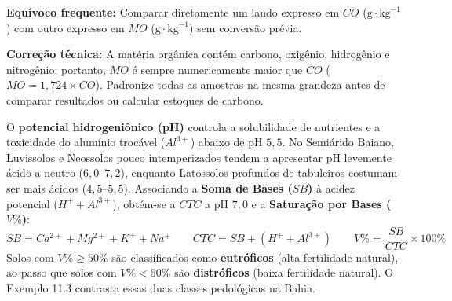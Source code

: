 \begin{boxErro}
\textbf{Equívoco frequente:} Comparar diretamente um laudo expresso em $CO$ ($\text{g}\cdot\text{kg}^{-1}$) com outro expresso em $MO$ ($\text{g}\cdot\text{kg}^{-1}$) sem conversão prévia.\par
\textbf{Correção técnica:} A matéria orgânica contém carbono, oxigênio, hidrogênio e nitrogênio; portanto, $MO$ é sempre numericamente maior que $CO$ ($MO = 1{,}724 \times CO$). Padronize todas as amostras na mesma grandeza antes de comparar resultados ou calcular estoques de carbono.
\end{boxErro}

O \textbf{potencial hidrogeniônico (pH)} controla a solubilidade de nutrientes e a toxicidade do alumínio trocável ($Al^{3+}$) abaixo de pH $5{,}5$. No Semiárido Baiano, Luvissolos e Neossolos pouco intemperizados tendem a apresentar pH levemente ácido a neutro ($6{,}0$--$7{,}2$), enquanto Latossolos profundos de tabuleiros costumam ser mais ácidos ($4{,}5$--$5{,}5$). Associando a \textbf{Soma de Bases ($SB$)} à acidez potencial ($H^+ + Al^{3+}$), obtém-se a $CTC$ a pH $7{,}0$ e a \textbf{Saturação por Bases ($V\%$)}:
\[
SB = Ca^{2+} + Mg^{2+} + K^+ + Na^+ \qquad CTC = SB + (H^+ + Al^{3+}) \qquad V\% = \frac{SB}{CTC}\times 100\%
\]
Solos com $V\% \ge 50\%$ são classificados como \textbf{eutróficos} (alta fertilidade natural), ao passo que solos com $V\% < 50\%$ são \textbf{distróficos} (baixa fertilidade natural). O Exemplo 11.3 contrasta essas duas classes pedológicas na Bahia.

